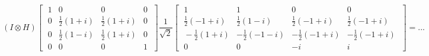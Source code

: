\documentclass[12pt]{article}
\begin{document}
$$(I\otimes H ) \begin{bmatrix}
    \;1 & 0& 0& 0 \;\\ 
    \;0 & \frac{1}{2}(1+i)& \frac{1}{2}(1+i)& 0\;\\
    \;0 & \frac{1}{2}(1-i)&\frac{1}{2}(1+i)& 0\;\\
    \;0 & 0& 0& 1\;
\end{bmatrix}\frac{1}{\sqrt{2}} \begin{bmatrix}
    \;1 & 1& 0& 0 \;\\ 
    \;\frac{1}{2}(-1+i) & \frac{1}{2}(1-i)& \frac{1}{2}(-1+i)& \frac{1}{2}(-1+i)\;\\
    \;-\frac{1}{2}(1+i) & -\frac{1}{2}(-1-i)&-\frac{1}{2}(-1+i)& -\frac{1}{2}(-1+i)\;\\
    \;0 & 0& -i& i\;
\end{bmatrix} =...$$
\end{document}
